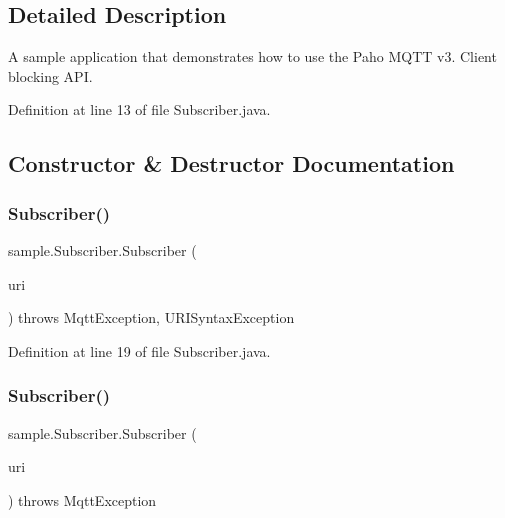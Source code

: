 \subsection{Detailed Description}
A sample application that demonstrates how to use the Paho M\+Q\+TT v3. Client blocking A\+PI. 

Definition at line 13 of file Subscriber.\+java.



\subsection{Constructor \& Destructor Documentation}
\mbox{\label{classsample_1_1_subscriber_ab8237e28d40bcc69a73ad35407e557a1}} 
\subsubsection{\texorpdfstring{Subscriber()}{Subscriber()}\hspace{0.1cm}{\footnotesize\ttfamily [1/2]}}
{\footnotesize\ttfamily sample.\+Subscriber.\+Subscriber (\begin{DoxyParamCaption}\item[{String}]{uri }\end{DoxyParamCaption}) throws Mqtt\+Exception, U\+R\+I\+Syntax\+Exception\hspace{0.3cm}{\ttfamily [inline]}}



Definition at line 19 of file Subscriber.\+java.

\mbox{\label{classsample_1_1_subscriber_a7f50c2706746360646405ae3469ca374}} 
\subsubsection{\texorpdfstring{Subscriber()}{Subscriber()}\hspace{0.1cm}{\footnotesize\ttfamily [2/2]}}
{\footnotesize\ttfamily sample.\+Subscriber.\+Subscriber (\begin{DoxyParamCaption}\item[{U\+RI}]{uri }\end{DoxyParamCaption}) throws Mqtt\+Exception\hspace{0.3cm}{\ttfamily [inline]}}



